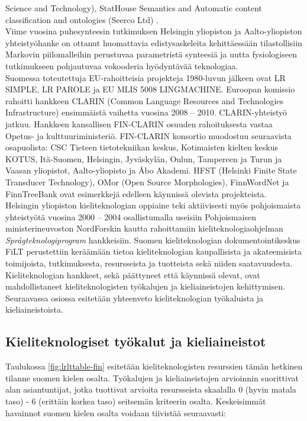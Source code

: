 \begin{multicols}{2}
Science and Technology), StatHouse Semantics and Automatic content
classification and ontologies (Seerco Ltd) \cite{LoppuFENIX}.\\
Viime vuosina puhesynteesin tutkimuksen Helsingin yliopiston ja
Aalto-yliopiston yhteistyöhanke on ottanut huomattavia
edistysaskeleita kehittäessään tilastollisiin Markovin piilomalleihin
perustuvaa parametristä synteesiä ja uutta fysiologiseen tutkimukseen
pohjautuvaa vokooderia hyödyntävää teknologiaa.\\
Suomessa toteutettuja EU-rahoitteisia projekteja 1980-luvun jälkeen
ovat LR SIMPLE, LR PAROLE ja EU MLIS 5008 LINGMACHINE. Euroopan
komissio rahoitti hankkeen CLARIN (Common Language Resources and
Technologies Infrastructure) ensimmäistä vaihetta vuosina 2008 –
2010. CLARIN-yhteistyö jatkuu. Hankkeen kansallisen FIN-CLARIN osuuden
rahoituksesta vastaa Opetus- ja kulttuuriministeriö. FIN-CLARIN
konsortio muodostuu seuraavista osapuolista: CSC Tieteen
tietotekniikan keskus, Kotimaisten kielten keskus KOTUS,
Itä-Suomen, Helsingin, Jyväskylän, Oulun, Tampereen ja Turun ja Vaasan
yliopistot, Aalto-yliopisto ja Åbo Akademi. HFST (Helsinki Finite
State Transducer Technology), OMor (Open Source Morphologies),
FinnWordNet ja FinnTreeBank ovat esimerkkejä edelleen käynnissä
olevista projekteista.\\
Helsingin yliopiston kieliteknologian oppiaine teki aktiivisesti myös
pohjoismaista yhteistyötä vuosina 2000 – 2004 osallistumalla
useisiin Pohjoismaisen ministerineuvoston NordForskin kautta
rahoittamiin kieliteknologiaohjelman \textit{Språgteknologiprogram}
hankkeisiin. Suomen kieliteknologian dokumentointikeskus FiLT
perustettiin keräämään tietoa kieliteknologian kaupallisista ja
akateemisista toimijoista, tutkimuksesta, resursseista ja tuotteista
sekä niiden saatavuudesta.\\
Kieliteknologian hankkeet, sekä päättyneet että käynnissä olevat, ovat
mahdollistaneet kieliteknologisten työkalujen ja kieliaineistojen
kehittymisen.  Seuraavassa osiossa esitetään yhteenveto
kieliteknologian työkaluista ja kieliaineistoista.


\subsection{Kieliteknologiset työkalut ja kieliaineistot}


Taulukossa \ref{fig:lrlttable-fin} esitetään kieliteknologisten
resurssien tämän hetkinen tilanne suomen kielen osalta. Työkalujen ja
kieliaineistojen arvioinnin suorittivat alan asiantuntijat, jotka
tuottivat arvioita resursseista skaalalla 0 (hyvin matala taso) - 6
(erittäin korkea taso) seitsemän kriteerin osalta.
Keskeisimmät havainnot suomen kielen osalta voidaan tiivistää seuraavasti:


\end{multicols}
